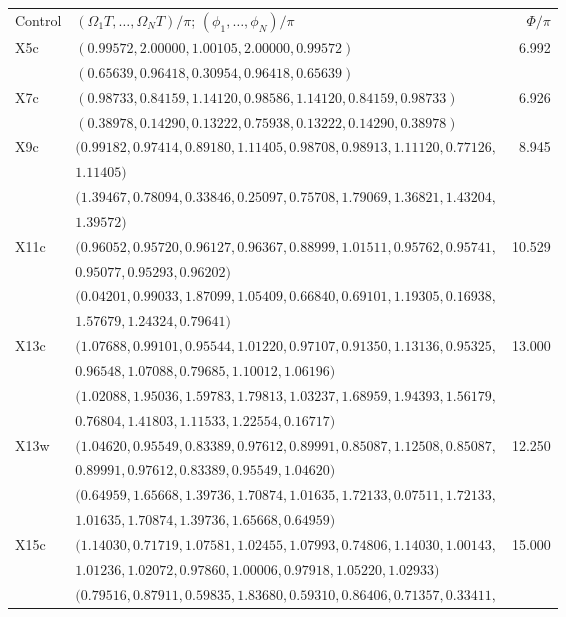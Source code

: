 \documentclass[10pt,aps,twocolumn,pra,floatfix,superscriptaddress]{revtex4-2}
\begin{document}
\begin{table}[tp]
\centering\small
\begin{ruledtabular}
\begin{tabular}{llr}
Control & $(\Omega_1T,\ldots,\Omega_NT)/\pi$; $(\phi_1,\ldots,\phi_N)/\pi$ & $\Phi/\pi$ \\
X5c & $(0.99572,2.00000,1.00105,2.00000,0.99572)$ & 6.992 \\
 & $(0.65639,0.96418,0.30954,0.96418,0.65639)$ &  \\
X7c & $(0.98733,0.84159,1.14120,0.98586,1.14120,0.84159,0.98733)$ & 6.926 \\
 & $(0.38978,0.14290,0.13222,0.75938,0.13222,0.14290,0.38978)$ &  \\
X9c & $(0.99182,0.97414,0.89180,1.11405,0.98708,0.98913,1.11120,0.77126,$ & 8.945 \\
 & $1.11405)$ &  \\
 & $(1.39467,0.78094,0.33846,0.25097,0.75708,1.79069,1.36821,1.43204,$ &  \\
 & $1.39572)$ &  \\
X11c & $(0.96052,0.95720,0.96127,0.96367,0.88999,1.01511,0.95762,0.95741,$ & 10.529 \\
 & $0.95077,0.95293,0.96202)$ &  \\
 & $(0.04201,0.99033,1.87099,1.05409,0.66840,0.69101,1.19305,0.16938,$ &  \\
 & $1.57679,1.24324,0.79641)$ &  \\
X13c & $(1.07688,0.99101,0.95544,1.01220,0.97107,0.91350,1.13136,0.95325,$ & 13.000 \\
 & $0.96548,1.07088,0.79685,1.10012,1.06196)$ &  \\
 & $(1.02088,1.95036,1.59783,1.79813,1.03237,1.68959,1.94393,1.56179,$ &  \\
 & $0.76804,1.41803,1.11533,1.22554,0.16717)$ &  \\
X13w & $(1.04620,0.95549,0.83389,0.97612,0.89991,0.85087,1.12508,0.85087,$ & 12.250 \\
 & $0.89991,0.97612,0.83389,0.95549,1.04620)$ &  \\
 & $(0.64959,1.65668,1.39736,1.70874,1.01635,1.72133,0.07511,1.72133,$ &  \\
 & $1.01635,1.70874,1.39736,1.65668,0.64959)$ &  \\
X15c & $(1.14030,0.71719,1.07581,1.02455,1.07993,0.74806,1.14030,1.00143,$ & 15.000 \\
 & $1.01236,1.02072,0.97860,1.00006,0.97918,1.05220,1.02933)$ &  \\
 & $(0.79516,0.87911,0.59835,1.83680,0.59310,0.86406,0.71357,0.33411,$ &  \\

\end{tabular}
\end{ruledtabular}
\end{table}
\end{document}
